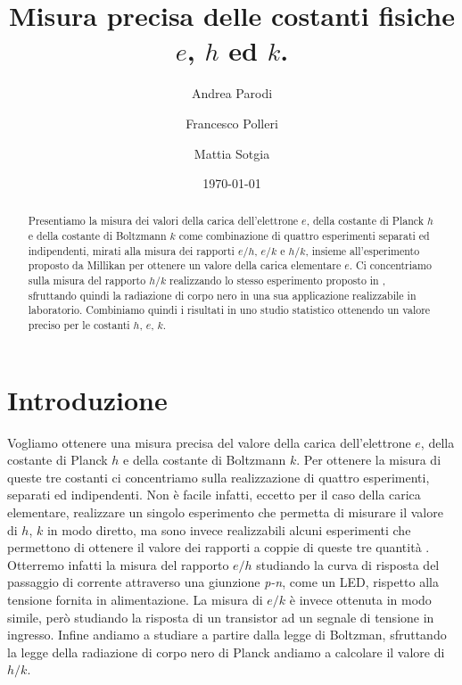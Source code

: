 \documentclass[a4paper, varvw, nofootinbib]{revtex4-2}
\begin{document}
\title{Misura precisa delle costanti fisiche $e$, $h$ ed $k$.}
\author{Andrea Parodi}
\author{Francesco Polleri}
\author{Mattia Sotgia}
\date{\today}

\begin{abstract}
Presentiamo la misura dei valori della carica dell'elettrone $e$, della costante di Planck $h$ e della costante di Boltzmann $k$ come combinazione di quattro esperimenti separati ed indipendenti, mirati alla misura dei rapporti $e/h$, $e/k$ \cite{inmanMeasurementIntroductoryPhysics1973} e $h/k$, insieme all'esperimento proposto da Millikan \cite{millikanIsolationIonPrecision1911} per ottenere un valore della carica elementare $e$. Ci concentriamo sulla misura del rapporto $h/k$ realizzando lo stesso esperimento proposto in \cite{crandallMinimalApparatusDetermination1983}, sfruttando quindi la radiazione di corpo nero in una sua applicazione realizzabile in laboratorio. Combiniamo quindi i risultati in uno studio statistico ottenendo un valore preciso per le costanti $h$, $e$, $k$.
\end{abstract}

\maketitle
\tableofcontents

\section{Introduzione}

Vogliamo ottenere una misura precisa del valore della carica dell'elettrone $e$, della costante di Planck $h$ e della costante di Boltzmann $k$. Per ottenere la misura di queste tre costanti ci concentriamo sulla realizzazione di quattro esperimenti, separati ed indipendenti. Non è facile infatti, eccetto per il caso della carica elementare, realizzare un singolo esperimento che permetta di misurare il valore di $h$, $k$ in modo diretto, ma sono invece realizzabili alcuni esperimenti che permettono di ottenere il valore dei rapporti a coppie di queste tre quantità \cite{inmanMeasurementIntroductoryPhysics1973, millikanIsolationIonPrecision1911, crandallMinimalApparatusDetermination1983}. Otterremo infatti la misura del rapporto $e/h$ studiando la curva di risposta del passaggio di corrente attraverso una giunzione \emph{p-n}, come un {LED}, rispetto alla tensione fornita in alimentazione. La misura di $e/k$ è invece ottenuta in modo simile, però studiando la risposta di un transistor ad un segnale di tensione in ingresso. Infine andiamo a studiare a partire dalla legge di Boltzman, sfruttando la legge della radiazione di corpo nero di Planck andiamo a calcolare il valore di $h/k$. 
\end{document}
